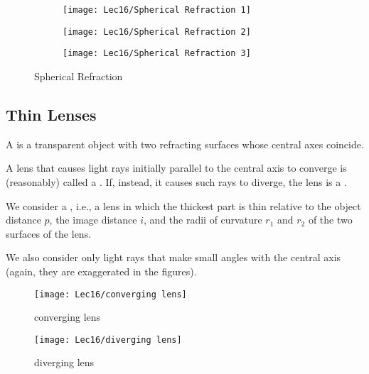 \begin{figure}[H]
    \centering
    \begin{subfigure}{0.309\textwidth}
        \centering
        \texttt{[image: Lec16/Spherical Refraction 1]}
    \end{subfigure}

    \begin{subfigure}{0.309\textwidth}
        \centering
        \texttt{[image: Lec16/Spherical Refraction 2]}
    \end{subfigure}

    \begin{subfigure}{0.309\textwidth}
        \centering
        \texttt{[image: Lec16/Spherical Refraction 3]}
    \end{subfigure}

    \caption{Spherical Refraction}
\end{figure}


\subsection{Thin Lenses}
A  is a transparent object with two refracting surfaces whose central axes coincide.

A lens that causes light rays initially parallel to the central axis to converge is (reasonably) called a . If, instead, it causes such rays to diverge, the lens is a .

We consider a , i.e., a lens in which the thickest part is thin relative to the object distance $p$, the image distance $i$, and the radii of curvature $r_1$ and $r_2$ of the two surfaces of the lens.

We also consider only light rays that make small angles with the central axis (again, they are exaggerated in the figures).

\begin{figure}[H]
    \centering
    \begin{minipage}{0.309\textwidth}
        \centering
        \texttt{[image: Lec16/converging lens]}
        \caption{converging lens}
    \end{minipage}

    \begin{minipage}{0.309\textwidth}
        \centering
        \texttt{[image: Lec16/diverging lens]}
        \caption{diverging lens}
    \end{minipage}
\end{figure}

